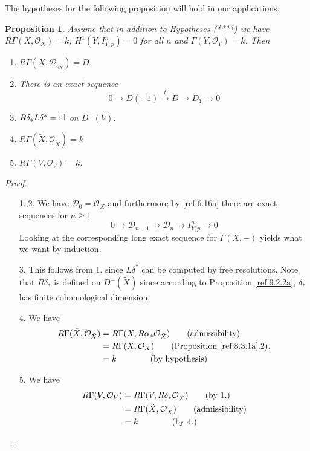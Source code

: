 \documentclass{amsproc}
\def\Dscr{{\mathcal D}}
\def\Oscr{{\mathcal O}}
\def\Id{\text{id}}
\def\r{\rightarrow}
\let\oldtext\text
\def\text#1{\oldtext{\upshape #1}}
\newtheorem{propositions}[lemmas]{Proposition}
\theoremstyle{definition}
\theoremstyle{remark}
\numberwithin{equation}{section}
\numberwithin{table}{section}
\numberwithin{figure}{section}
\begin{document}
The hypotheses for the following proposition will hold in our applications.
\begin{propositions}
\label{ref:9.2.3a}
  Assume that in addition to Hypotheses (****) we have
  $R\Gamma(X,\Oscr_X)=k$, $H^1(Y,I^n_{Y,p})=0$ for all $n$
  and $\Gamma(Y, \Oscr_Y)=k$.  Then
\begin{enumerate}
\item $R\Gamma(X,\Dscr_{o_X})=D$.
\item There is an exact sequence
\[
0\r D(-1)\xrightarrow{t} D \rightarrow D_Y\r 0
\]
\item $R\delta_\ast L\delta^\ast=\Id$ on $D^-(V)$.
\item $R\Gamma(\tilde{X},\Oscr_{\tilde{X}})=k$
\item $R\Gamma(V,\Oscr_V)=k$.
\end{enumerate}
\end{propositions}
\begin{proof}
\begin{itemize}
\item[1.,2.]
We have $\Dscr_0=\Oscr_X$ and furthermore by \eqref{ref:6.16a} there
are exact sequences for $n\ge 1$
\[
0\r \Dscr_{n-1}\r \Dscr_n \r I^n_{Y,p}\r 0
\]
Looking at the corresponding long exact sequence for $\Gamma(X,-)$
yields what we want by induction.
\item[3.] This follows from 1. since $L\delta^\ast$ can be computed by
  free resolutions. Note that $R\delta_\ast$ is defined on
  $D^-(\tilde{X})$ since according to Proposition \ref{ref:9.2.2a},
  $\delta_\ast$ has finite cohomological  dimension.
\item[4.] We have
\begin{align*}
R\Gamma(\tilde{X},\Oscr_{\tilde{X}})
&=R\Gamma(X, R\alpha_\ast \Oscr_{\tilde{X}})\qquad
\text{(admissibility)}\\
&=R\Gamma(X,\Oscr_X)\qquad (\text{Proposition \ref{ref:8.3.1a}.2}).\\
&=k \qquad\qquad (\text{by hypothesis})
\end{align*}
\item[5.] We have
\begin{align*}
R\Gamma(V,\Oscr_V)&=R\Gamma(V,R\delta_\ast \Oscr_{\tilde{X}})\qquad
\text{(by 1.)}\\
&=R\Gamma(\tilde{X},\Oscr_{\tilde{X}})\qquad\text{(admissibility)}\\
&=k \qquad\qquad (\text{by 4.})\qed
\end{align*}
\end{itemize}
\def\qed{}
\end{proof}
\end{document}
